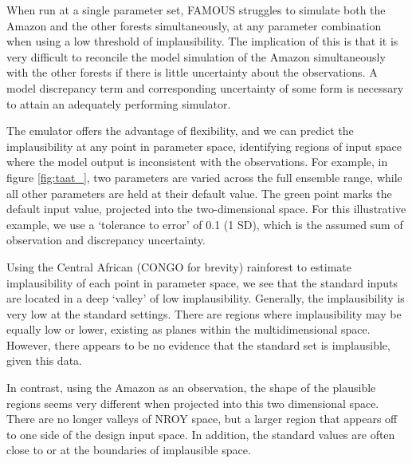 \documentclass[esd, manuscript]{copernicus}
\begin{document}
When run at a single parameter set, FAMOUS struggles to simulate both the Amazon and the other forests simultaneously, at any parameter combination when using a low threshold of implausibility. The implication of this is that it is very difficult to reconcile the model simulation of the Amazon simultaneously with the other forests if there is little uncertainty about the observations. A model discrepancy term and corresponding uncertainty of some form is necessary to attain an adequately performing simulator.

The emulator offers the advantage of flexibility, and we can predict the implausibility at any point in parameter space, identifying regions of input space where the model output is inconsistent with the observations. For example, in figure \ref{fig:taat_}, two parameters are varied across the full ensemble range, while all other parameters are held at their default value. The green point marks the default input value, projected into the two-dimensional space. For this illustrative example, we use a `tolerance to error' of 0.1 (1 SD), which is the assumed sum of observation and discrepancy uncertainty.

Using the Central African (CONGO for brevity) rainforest to estimate implausibility of each point in parameter space, we see that the standard inputs are located in a deep `valley' of low implausibility. Generally, the implausibility is very low at the standard settings. There are regions where implausibility may be equally low or lower, existing as planes within the multidimensional space. However, there appears to be no evidence that the standard set is implausible, given this data.

In contrast, using the Amazon as an observation, the shape of the plausible regions seems very different when projected into this two dimensional space. There are no longer valleys of NROY space, but a larger region that appears off to one side of the design input space. In addition, the standard values are often close to or at the boundaries of implausible space.

\end{document}
